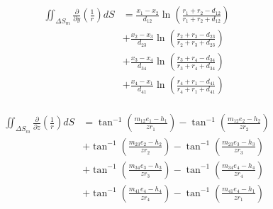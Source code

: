 \begin{align}
    \begin{split}
        \label{eq:partial_r_y}
        \iint_{\Delta S_m} \frac{\partial}{\partial y}\left(\frac{1}{r}\right) d S
        &= \frac{x_{1}-x_{2}}{d_{12}} \ln \left(\frac{r_{1}+r_{2}-d_{12}}{r_{1}+r_{2}+d_{12}}\right)\\ &+\frac{x_{2}-x_{3}}{d_{23}} \ln \left(\frac{r_{2}+r_{3}-d_{23}}{r_{2}+r_{3}+d_{23}}\right) \\
        &+\frac{x_{3}-x_{4}}{d_{34}} \ln \left(\frac{r_{3}+r_{4}-d_{34}}{r_{3}+r_{4}+d_{34}}\right)\\ &+\frac{x_{4}-x_{1}}{d_{41}} \ln \left(\frac{r_{4}+r_{1}-d_{41}}{r_{4}+r_{1}+d_{41}}\right)
    \end{split}
\end{align}

\begin{align}
    \begin{split}
        \label{eq:partial_r_z}
        \iint_{\Delta S_m} \frac{\partial}{\partial z}\left(\frac{1}{r}\right) dS 
        &=\tan ^{-1}\left(\frac{m_{12} e_{1}-h_{1}}{z r_{1}}\right)-\tan ^{-1}\left(\frac{m_{12} e_{2}-h_{2}}{z r_{2}}\right) \\
        &+\tan ^{-1}\left(\frac{m_{23} e_{2}-h_{2}}{z r_{2}}\right)-\tan ^{-1}\left(\frac{m_{23} e_{3}-h_{3}}{z r_{3}}\right) \\
        &+\tan ^{-1}\left(\frac{m_{34} e_{3}-h_{3}}{z r_{3}}\right)-\tan ^{-1}\left(\frac{m_{34} e_{4}-h_{4}}{z r_{4}}\right) \\
        &+\tan ^{-1}\left(\frac{m_{41} e_{4}-h_{4}}{z r_{4}}\right)-\tan ^{-1}\left(\frac{m_{41} e_{4}-h_{1}}{z r_{1}}\right)
    \end{split}
\end{align}

